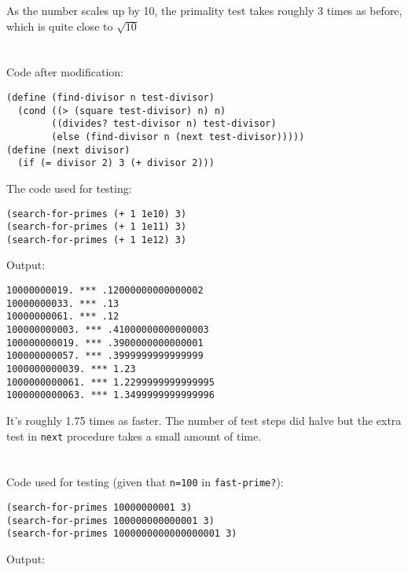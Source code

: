 \documentclass[../main.tex]{subfiles}
\begin{document}
As the number scales up by 10, the primality
 test takes roughly 3 times as before, which is
 quite close to $\sqrt{10}$


\section{}

Code after modification:

\begin{lstlisting}
(define (find-divisor n test-divisor)
  (cond ((> (square test-divisor) n) n)
        ((divides? test-divisor n) test-divisor)
        (else (find-divisor n (next test-divisor)))))
(define (next divisor)
  (if (= divisor 2) 3 (+ divisor 2)))
\end{lstlisting}

The code used for testing:

\begin{lstlisting}
(search-for-primes (+ 1 1e10) 3)
(search-for-primes (+ 1 1e11) 3)
(search-for-primes (+ 1 1e12) 3)
\end{lstlisting}

Output:

\begin{lstlisting}
10000000019. *** .12000000000000002
10000000033. *** .13
10000000061. *** .12
100000000003. *** .41000000000000003
100000000019. *** .3900000000000001
100000000057. *** .3999999999999999
1000000000039. *** 1.23
1000000000061. *** 1.2299999999999995
1000000000063. *** 1.3499999999999996
\end{lstlisting}

It's roughly 1.75 times as faster. The number of test steps
 did halve but the extra test in \lstinline{next} procedure
 takes a small amount of time.


\section{}

Code used for testing (given that \lstinline{n=100} in \lstinline{fast-prime?}):

\begin{lstlisting}
(search-for-primes 10000000001 3)
(search-for-primes 100000000000001 3)
(search-for-primes 1000000000000000001 3)
\end{lstlisting}

Output:
\end{document}
